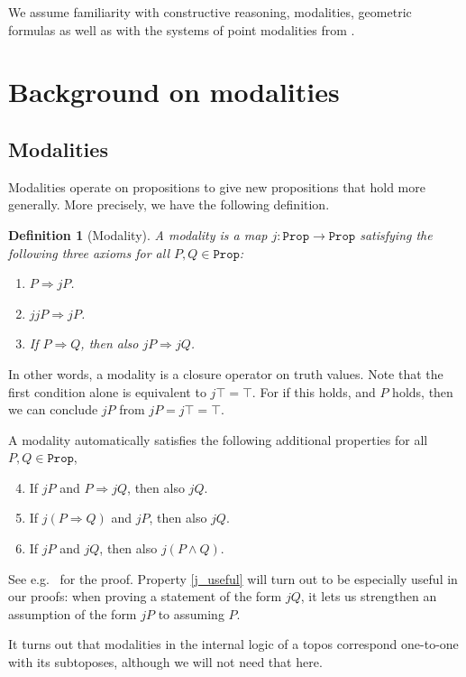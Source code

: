 \documentclass[reqno,11pt]{amsproc}
\theoremstyle{plain}
\newtheorem{definition}[theorem]{Definition}
\theoremstyle{definition}
\newcommand{\Const}[1]{\mathtt{#1}}
\renewcommand{\to}[1][]{\xrightarrow{#1}}
\newcommand{\prop}{\Const{Prop}}
\newcommand{\imp}{\Rightarrow}
\numberwithin{equation}{section}
\begin{document}
We assume familiarity with constructive reasoning, modalities, geometric formulas as well as with the systems of point modalities from .

\section{Background on modalities}

\subsection{Modalities}

Modalities operate on propositions to give new propositions that hold more generally. More precisely, we have the following definition. 

\begin{definition}[Modality]
	\label{def.modality}
	A \emph{modality} is a map $j \colon \prop \to \prop$ satisfying the following three axioms for all $P,Q \in \prop$:
	\begin{enumerate}
		\item $P\imp jP$.
		\item $jjP \imp jP$.
  		\item If $P \imp Q$, then also $jP \imp jQ$.
	\end{enumerate}
\end{definition}

In other words, a modality is a closure operator on truth values. Note that the first condition alone is equivalent to $j\top = \top$. For if this holds, and $P$ holds, then we can conclude $jP$ from $jP = j\top = \top$.

A modality automatically satisfies the following additional properties for all $P,Q \in \prop$,
\begin{enumerate}
	\setcounter{enumi}{3}	%
	\item\label{j_useful} If $jP$ and $P\imp jQ$, then also $jQ$.
	\item If $j(P\imp Q)$ and $jP$, then also $jQ$.
	\item If $jP$ and $jQ$, then also $j(P\wedge Q)$.
\end{enumerate}
See e.g.~\cite[Lemma~4.6]{schultz2019temporal} for the proof. Property \ref{j_useful} will turn out to be especially useful in our proofs: when proving a statement of the form $jQ$, it lets us strengthen an assumption of the form $jP$ to assuming $P$.

It turns out that modalities in the internal logic of a topos correspond one-to-one with its subtoposes, although we will not need that here.
\end{document}

